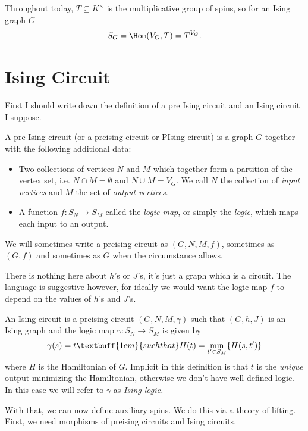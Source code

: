 Throughout today, $T\subseteq K^\times$ is the multiplicative group of spins, so for an Ising graph $G$
\begin{align*}
	S_G = \Hom(V_G,T) = T^{V_G}.
\end{align*}

\section*{Ising Circuit}
First I should write down the definition of a pre Ising circuit and an Ising circuit I suppose.

\begin{defn}\label{defn:pre-ising-circuit}
	A pre-Ising circuit (or a preising circuit or PIsing circuit) is a graph $G$ together with the following additional data:
	\begin{itemize}
	\item Two collections of vertices $N$ and $M$ which together form a partition of the vertex set, i.e. $N \cap M = \emptyset$ and $N \cup M = V_G$. We call $N$ the collection of \emph{input vertices} and $M$ the set of \emph{output vertices}.
		\item A function $f:S_N\to S_M$ called the \emph{logic map}, or simply the \emph{logic}, which maps each input to an output.
	\end{itemize}
	We will sometimes write a preising circuit as $(G,N,M,f)$, sometimes as $(G,f)$ and sometimes as $G$ when the circumstance allows.
\end{defn}
There is nothing here about $h$'s or $J$'s, it's just a graph which is a circuit. The language is suggestive however, for ideally we would want the logic map $f$ to depend on the values of $h$'s and $J$'s.
\begin{defn}\label{defn:ising-circuit}
	An Ising circuit is a preising circuit $(G,N,M,\gamma)$ such that $(G,h,J)$ is an Ising graph and the logic map $\gamma:S_N\to S_M$ is given by
	\begin{align*}
		\gamma(s) = t \textbuff{1em}{such that} H(t) = \min_{t' \in S_M}\{H(s,t')\}
	\end{align*}
	where $H$ is the Hamiltonian of $G$. Implicit in this definition is that $t$ is the \emph{unique} output minimizing the Hamiltonian, otherwise we don't have well defined logic. In this case we will refer to $\gamma$ as \emph{Ising logic.}
\end{defn}
With that, we can now define auxiliary spins. We do this via a theory of lifting. First, we need morphisms of preising circuits and Ising circuits.

